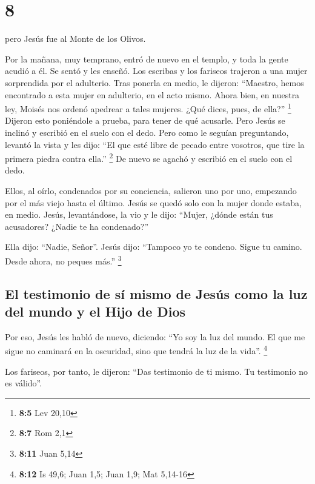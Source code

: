 \hypertarget{section-7}{%
\section{8}\label{section-7}}

 pero Jesús fue al Monte de los Olivos.

 Por la mañana, muy temprano, entró de nuevo en el templo,
y toda la gente acudió a él. Se sentó y les enseñó.  Los
escribas y los fariseos trajeron a una mujer sorprendida por el
adulterio. Tras ponerla en medio,  le dijeron: ``Maestro,
hemos encontrado a esta mujer en adulterio, en el acto mismo.
 Ahora bien, en nuestra ley, Moisés nos ordenó apedrear a
tales mujeres. ¿Qué dices, pues, de ella?'' \footnote{\textbf{8:5} Lev
  20,10}  Dijeron esto poniéndole a prueba, para tener de
qué acusarle. Pero Jesús se inclinó y escribió en el suelo con el dedo.
 Pero como le seguían preguntando, levantó la vista y les
dijo: ``El que esté libre de pecado entre vosotros, que tire la primera
piedra contra ella.'' \footnote{\textbf{8:7} Rom 2,1}  De
nuevo se agachó y escribió en el suelo con el dedo.

 Ellos, al oírlo, condenados por su conciencia, salieron
uno por uno, empezando por el más viejo hasta el último. Jesús se quedó
solo con la mujer donde estaba, en medio.  Jesús,
levantándose, la vio y le dijo: ``Mujer, ¿dónde están tus acusadores?
¿Nadie te ha condenado?''

 Ella dijo: ``Nadie, Señor''. Jesús dijo: ``Tampoco yo te
condeno. Sigue tu camino. Desde ahora, no peques más.'' \footnote{\textbf{8:11}
  Juan 5,14}

\hypertarget{el-testimonio-de-suxed-mismo-de-jesuxfas-como-la-luz-del-mundo-y-el-hijo-de-dios}{%
\subsection{El testimonio de sí mismo de Jesús como la luz del mundo y
el Hijo de
Dios}\label{el-testimonio-de-suxed-mismo-de-jesuxfas-como-la-luz-del-mundo-y-el-hijo-de-dios}}

 Por eso, Jesús les habló de nuevo, diciendo: ``Yo soy la
luz del mundo. El que me sigue no caminará en la oscuridad, sino que
tendrá la luz de la vida''. \footnote{\textbf{8:12} Is 49,6; Juan 1,5;
  Juan 1,9; Mat 5,14-16}

 Los fariseos, por tanto, le dijeron: ``Das testimonio de
ti mismo. Tu testimonio no es válido''.

